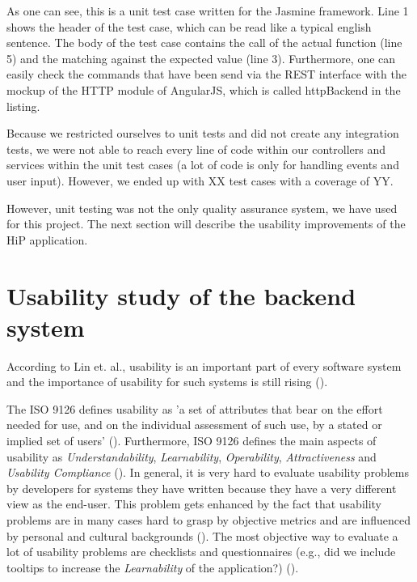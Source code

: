 As one can see, this is a unit test case written for the Jasmine framework. Line 1 shows the header of the test case, which can be read like a typical english sentence. The body of the test case contains the call of the actual function (line 5) and the matching against the expected value (line 3). Furthermore, one can easily check the commands that have been send via the \ac{REST} interface with the mockup of the \ac{HTTP} module of AngularJS, which is called httpBackend in the listing.

Because we restricted ourselves to unit tests and did not create any integration tests, we were not able to reach every line of code within our controllers and services within the unit test cases (a lot of code is only for handling events and user input). However, we ended up with XX test cases with a coverage of YY. 

However, unit testing was not the only quality assurance system, we have used for this project. The next section will describe the usability improvements of the \ac{HiP} application.

\section{Usability study of the backend system}
According to Lin et. al., usability is an important part of every software system and the importance of usability for such systems is still rising (\cite{lin1997proposed}). 

The ISO 9126 defines usability as 'a set of attributes that bear on the effort needed for use, and on the individual assessment of such use, by a stated or implied set of users' (\cite{bevan1997quality}). Furthermore, ISO 9126 defines the main aspects of usability as \emph{Understandability}, \emph{Learnability}, \emph{Operability}, \emph{Attractiveness} and \emph{Usability Compliance} (\cite{bevan1997quality}). In general, it is very hard to evaluate usability problems by developers for systems they have written because they have a very different view as the end-user. This problem gets enhanced by the fact that usability problems are in many cases hard to grasp by objective metrics and are influenced by personal and cultural backgrounds (\cite{herman1996towards}). The most objective way to evaluate a lot of usability problems are checklists and questionnaires (e.g., did we include tooltips to increase the \emph{Learnability} of the application?) (\cite{herman1996towards}). 

